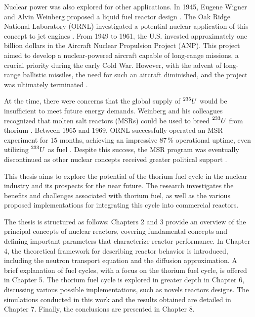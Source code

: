 Nuclear power was also explored for other applications. In 1945, Eugene Wigner and Alvin Weinberg proposed a liquid fuel reactor design \cite{TMSR_book}. The Oak Ridge National Laboratory (ORNL) investigated a potential nuclear application of this concept to jet engines \cite{TMSR_book}. From 1949 to 1961, the U.S. invested approximately one billion dollars in the Aircraft Nuclear Propulsion Project (ANP). This project aimed to develop a nuclear-powered aircraft capable of long-range missions, a crucial priority during the early Cold War. However, with the advent of long-range ballistic missiles, the need for such an aircraft diminished, and the project was ultimately terminated \cite{Lamarsh_Baratta_2009}.

At the time, there were concerns that the global supply of \(\prescript{235}{}{U}\) would be insufficient to meet future energy demands. Weinberg and his colleagues recognized that molten salt reactors (MSRs) could be used to breed \(\prescript{233}{}{U}\) from thorium \cite{TMSR_book}. Between 1965 and 1969, ORNL successfully operated an MSR experiment for 15 months, achieving an impressive \(87 \, \%\) operational uptime, even utilizing \(\prescript{233}{}{U}\) as fuel \cite{TMSR_book}. Despite this success, the MSR program was eventually discontinued as other nuclear concepts received greater political support \cite{TMSR_book}.

This thesis aims to explore the potential of the thorium fuel cycle in the nuclear industry and its prospects for the near future. The research investigates the benefits and challenges associated with thorium fuel, as well as the various proposed implementations for integrating this cycle into commercial reactors.

The thesis is structured as follows: Chapters 2 and 3 provide an overview of the principal concepts of nuclear reactors, covering fundamental concepts and defining important parameters that characterize reactor performance. In Chapter 4, the theoretical framework for describing reactor behavior is introduced, including the neutron transport equation and the diffusion approximation. A brief explanation of fuel cycles, with a focus on the thorium fuel cycle, is offered in Chapter 5. The thorium fuel cycle is explored in greater depth in Chapter 6, discussing various possible implementations, such as novels reactors designs. The simulations conducted in this work and the results obtained are detailed in Chapter 7. Finally, the conclusions are presented in Chapter 8.